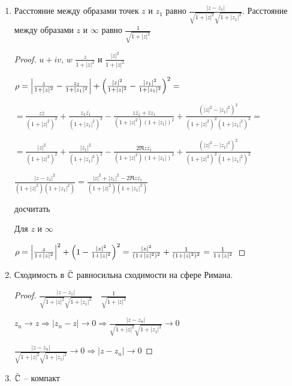 \begin{consequence}\thmslashn
	
	\begin{enumerate}
		\item 
		Расстояние между образами точек $z$ и $z_1$ равно $\frac{|z - z_1|}{\sqrt{1 + |z|^2}\sqrt{1 + |z_1|^2}}$. Расстояние между образами $z$ и $\infty$ равно $\frac{1}{\sqrt{1 + |z|^2}}$
		
		\begin{proof}\thmslashn
			
			$u + iv$, $w$ $\frac{z}{1 + |z|^2}$ и $\frac{|z|^2}{1 + |z|^2}$
			
			$\rho = \left|\frac{z}{1 + |z|^2} - \frac{z_1}{1 + |z_1|^2}\right| + \left(\frac{|z|^2}{1 + |z|^2} - \frac{|z_1|^2}{1 + |z_1|^2} \right)^2 = $
			
			$= \frac{z\bar{z}}{(1 + |z|^2)^2} + \frac{z_1\bar{z_1}}{(1 + |z_1|^2)^2} - \frac{z\bar{z_1} + \bar{z}z_1}{(1 + |z|^2)(1 + |z_1|)^2} + \frac{(|z|^2 - |z_1|^2)^2}{(1 + |z|^2)^2(1 + |z_1|^2)^2} = $
			
			$= \frac{|z|^2}{(1 + |z|^2)^2} + \frac{|z_1|^2}{(1 + |z_1|^2)^2} - \frac{2\Re z\bar{z_1}}{(1 + |z|^2)(1 + |z_1|)^2} + \frac{(|z|^2 - |z_1|^2)^2}{(1 + |z|^2)^2(1 + |z_1|^2)^2}$
			
			$\frac{|z-z_1|^2}{(1+|z|^2)(1 + |z_1|^2)} = \frac{|z|^2 + |z_1|^2 - 2\Re z \bar{z_1}}{(1+|z|^2)(1 + |z_1|^2)}$
		
			\TODO досчитать
			
			Для $z$ и $\infty$
			
			$\rho = \left|\frac{z}{1 + |z|^2}\right|^2 + \left(1 - \frac{|z|^2}{1+|z|^2}\right)^2 = \frac{|z|^2}{(1 + |z|^2)^2} + \frac{1}{(1 + |z|^2)^2} = \frac{1}{1 + |z|^2}$
		\end{proof}
	
		\item
		Сходимость в $\bar{\mathbb{C}}$ равносильна сходимости на сфере Римана.
		
		\begin{proof}\thmslashn
			
			$\frac{|z-z_1|}{\sqrt{1+|z|^2}\sqrt{1+|z_1|^2}} \quad \frac{1}{\sqrt{1 + |z|^2}}$
			
			$z_n \to z \Rightarrow |z_n - z| \to 0 \Rightarrow \frac{|z - z_n|}{\sqrt{1+|z|^2}\sqrt{1+|z_1|^2}} \to 0$
		
			$\frac{|z - z_n|}{\sqrt{1+|z|^2}\sqrt{1+|z_1|^2}} \to 0 \Rightarrow |z - z_n| \to 0$
		
		\end{proof}
		
		\item
		$\bar{\mathbb{C}}$ -- компакт
	\end{enumerate}
	
\end{consequence}

